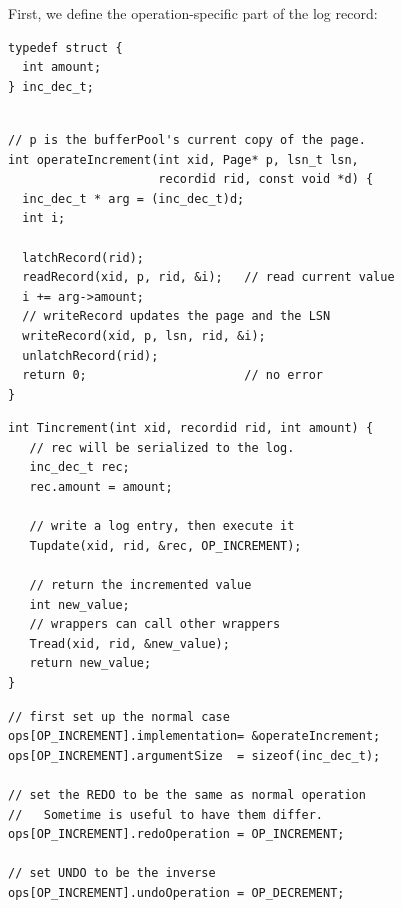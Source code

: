 \documentclass[letterpaper,twocolumn,english]{article}
\begin{document}
First, we define the operation-specific part of the log record:
\begin{small}
\begin{verbatim}
typedef struct {
  int amount;
} inc_dec_t;
\end{verbatim}
\begin{verbatim}

// p is the bufferPool's current copy of the page.
int operateIncrement(int xid, Page* p, lsn_t lsn,
                     recordid rid, const void *d) {
  inc_dec_t * arg = (inc_dec_t)d;
  int i;

  latchRecord(rid); 
  readRecord(xid, p, rid, &i);   // read current value
  i += arg->amount;
  // writeRecord updates the page and the LSN
  writeRecord(xid, p, lsn, rid, &i);
  unlatchRecord(rid); 
  return 0;                      // no error
}
\end{verbatim}
\begin{verbatim}
int Tincrement(int xid, recordid rid, int amount) {
   // rec will be serialized to the log.
   inc_dec_t rec;
   rec.amount = amount;

   // write a log entry, then execute it
   Tupdate(xid, rid, &rec, OP_INCREMENT);

   // return the incremented value
   int new_value;
   // wrappers can call other wrappers
   Tread(xid, rid, &new_value);
   return new_value;
}
\end{verbatim}
\begin{verbatim}
// first set up the normal case
ops[OP_INCREMENT].implementation= &operateIncrement;
ops[OP_INCREMENT].argumentSize  = sizeof(inc_dec_t);

// set the REDO to be the same as normal operation
//   Sometime is useful to have them differ.
ops[OP_INCREMENT].redoOperation = OP_INCREMENT;

// set UNDO to be the inverse
ops[OP_INCREMENT].undoOperation = OP_DECREMENT;
\end{verbatim}
\end{small}

\end{document}
